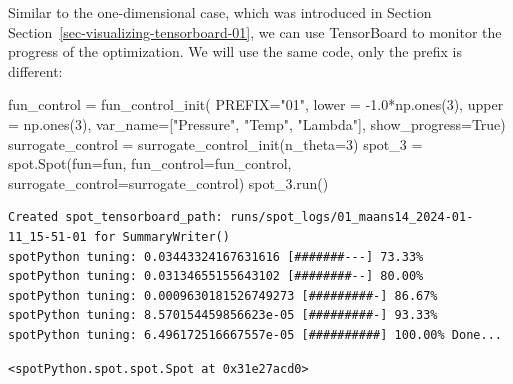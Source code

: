 \documentclass[
  letterpaper,
  DIV=11,
  numbers=noendperiod]{scrreprt}
\newenvironment{Shaded}{\begin{snugshade}}{\end{snugshade}}
\newcommand{\DecValTok}[1]{\textcolor[rgb]{0.68,0.00,0.00}{#1}}
\newcommand{\FloatTok}[1]{\textcolor[rgb]{0.68,0.00,0.00}{#1}}
\newcommand{\NormalTok}[1]{\textcolor[rgb]{0.00,0.23,0.31}{#1}}
\newcommand{\OperatorTok}[1]{\textcolor[rgb]{0.37,0.37,0.37}{#1}}
\newcommand{\StringTok}[1]{\textcolor[rgb]{0.13,0.47,0.30}{#1}}
\newcommand{\VariableTok}[1]{\textcolor[rgb]{0.07,0.07,0.07}{#1}}
\begin{document}
Similar to the one-dimensional case, which was introduced in Section
Section~\ref{sec-visualizing-tensorboard-01}, we can use TensorBoard to
monitor the progress of the optimization. We will use the same code,
only the prefix is different:

\begin{Shaded}
\begin{Highlighting}[]
\NormalTok{fun\_control }\OperatorTok{=}\NormalTok{ fun\_control\_init(}
\NormalTok{              PREFIX}\OperatorTok{=}\StringTok{"01"}\NormalTok{,}
\NormalTok{              lower }\OperatorTok{=} \OperatorTok{{-}}\FloatTok{1.0}\OperatorTok{*}\NormalTok{np.ones(}\DecValTok{3}\NormalTok{),}
\NormalTok{              upper }\OperatorTok{=}\NormalTok{ np.ones(}\DecValTok{3}\NormalTok{),}
\NormalTok{              var\_name}\OperatorTok{=}\NormalTok{[}\StringTok{"Pressure"}\NormalTok{, }\StringTok{"Temp"}\NormalTok{, }\StringTok{"Lambda"}\NormalTok{],}
\NormalTok{              show\_progress}\OperatorTok{=}\VariableTok{True}\NormalTok{)}
\NormalTok{surrogate\_control }\OperatorTok{=}\NormalTok{ surrogate\_control\_init(n\_theta}\OperatorTok{=}\DecValTok{3}\NormalTok{)}
\NormalTok{spot\_3 }\OperatorTok{=}\NormalTok{ spot.Spot(fun}\OperatorTok{=}\NormalTok{fun,}
\NormalTok{                  fun\_control}\OperatorTok{=}\NormalTok{fun\_control,}
\NormalTok{                  surrogate\_control}\OperatorTok{=}\NormalTok{surrogate\_control)}
\NormalTok{spot\_3.run()}
\end{Highlighting}
\end{Shaded}

\begin{verbatim}
Created spot_tensorboard_path: runs/spot_logs/01_maans14_2024-01-11_15-51-01 for SummaryWriter()
spotPython tuning: 0.03443324167631616 [#######---] 73.33% 
spotPython tuning: 0.03134655155643102 [########--] 80.00% 
spotPython tuning: 0.0009630181526749273 [#########-] 86.67% 
spotPython tuning: 8.570154459856623e-05 [#########-] 93.33% 
spotPython tuning: 6.496172516667557e-05 [##########] 100.00% Done...
\end{verbatim}

\begin{verbatim}
<spotPython.spot.spot.Spot at 0x31e27acd0>
\end{verbatim}
\end{document}
